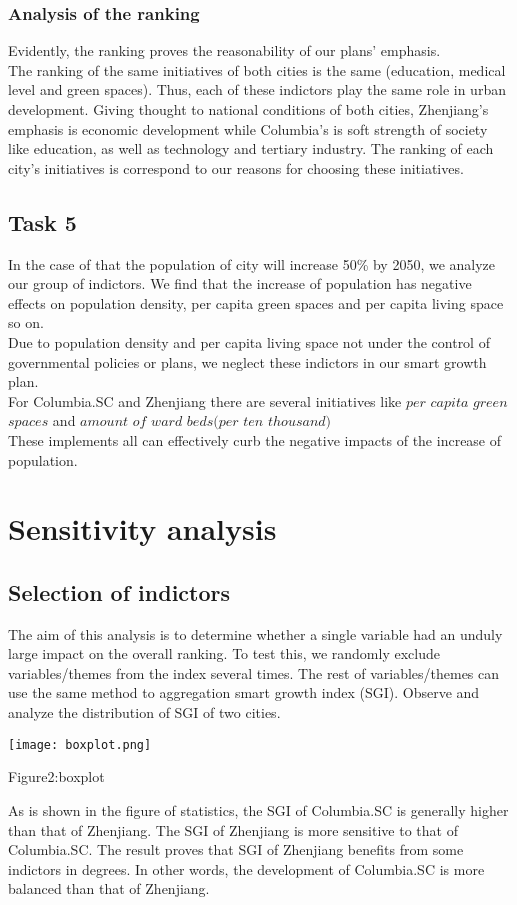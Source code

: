 \documentclass{mcmthesis}
\begin{document}
\subsubsection{Analysis of the ranking}%
Evidently, the ranking proves the reasonability of our plans' emphasis.\\
The ranking of the same initiatives of both cities is the same (education, medical level and green spaces). Thus, each of these indictors play the same role in urban development.  
Giving thought to national conditions of both cities, Zhenjiang's emphasis is economic development while Columbia's is soft strength of society like education, as well as technology and tertiary industry. The ranking of each city's initiatives is correspond to our reasons for choosing these initiatives. \\
\subsection{Task 5}%
In the case of that the population of city will increase 50\% by 2050, we analyze our group of indictors. We find that the increase of population has negative effects on population density, per capita green spaces and per capita living space so on.\\
Due to population density and per capita living space not under the control of governmental policies or plans, we neglect these indictors in our smart growth plan.\\
For Columbia.SC and Zhenjiang there are several initiatives like $per$ $capita$ $green$ $spaces$ and $amount$ $of$ $ward$ $beds(per$ $ten$ $thousand)$\\
These implements all can effectively curb the negative impacts of the increase of population. \\
\newpage
\section{Sensitivity analysis}
\subsection{Selection of indictors}%
The aim of this analysis is to determine whether a single variable had an unduly large impact on the overall ranking. To test this, we randomly exclude variables/themes from the index several times. The rest of variables/themes can use the same method to aggregation smart growth index (SGI). Observe and analyze the distribution of SGI of two cities.\\
\centerline{\texttt{[image: boxplot.png]}}
\centerline{Figure2:boxplot}
As is shown in the figure of statistics, the SGI of Columbia.SC is generally higher than that of Zhenjiang. The SGI of Zhenjiang is more sensitive to that of Columbia.SC. The result proves that SGI of Zhenjiang benefits from some indictors in degrees. In other words, the development of Columbia.SC is more balanced than that of Zhenjiang.\\
\end{document}
